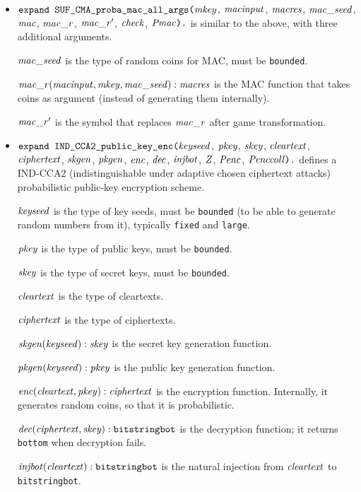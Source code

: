 \documentclass{article}
\begin{document}
\begin{itemize}
\item $\texttt{expand SUF\_CMA\_proba\_mac\_all\_args(}\mathit{mkey}$,
$  \mathit{macinput}$, $\mathit{macres}$, $\mathit{mac\_seed}$, $\mathit{mac}$, $\mathit{mac\_r}$, $\mathit{mac\_r}'$, $\mathit{check}$, 
  $\mathit{Pmac}\texttt{).}$ is similar to the above,
  with three additional arguments. 

  $\mathit{mac\_seed}$ is the type of random coins for MAC, must be \texttt{bounded}.

  $\mathit{mac\_r}(\mathit{macinput}, \mathit{mkey}, \mathit{mac\_seed}): \mathit{macres}$ is the MAC function that takes coins as argument (instead of generating them internally).

  $\mathit{mac\_r}'$ is the symbol that replaces $\mathit{mac\_r}$ after game transformation.

\item $\texttt{expand IND\_CCA2\_public\_key\_enc(}\mathit{keyseed}$, $\mathit{pkey}$, $\mathit{skey}$,
$  \mathit{cleartext}$, $\mathit{ciphertext}$, $\mathit{skgen}$, $\mathit{pkgen}$, $\mathit{enc}$, $\mathit{dec}$, $\mathit{injbot}$, $\mathit{Z}$, $\mathit{Penc}$, $\mathit{Penccoll}\texttt{).}$ defines a
  IND-CCA2 (indistinguishable under adaptive chosen ciphertext attacks)
  probabilistic public-key encryption scheme.

   $\mathit{keyseed}$ is the type of key seeds, must be \texttt{bounded} (to be able to generate random numbers from it), typically \texttt{fixed} and \texttt{large}.

   $\mathit{pkey}$ is the type of public keys, must be \texttt{bounded}.

   $\mathit{skey}$ is the type of secret keys, must be \texttt{bounded}.

   $\mathit{cleartext}$ is the type of cleartexts.

   $\mathit{ciphertext}$ is the type of ciphertexts.

   $\mathit{skgen}(\mathit{keyseed}): \mathit{skey}$ is the secret key generation function.

   $\mathit{pkgen}(\mathit{keyseed}): \mathit{pkey}$ is the public key generation function.

   $\mathit{enc}(\mathit{cleartext}, \mathit{pkey}): \mathit{ciphertext}$ is the encryption function. Internally, it generates random coins, so that it is probabilistic.

   $\mathit{dec}(\mathit{ciphertext}, \mathit{skey}): \texttt{bitstringbot}$ is the
  decryption function; it returns \texttt{bottom} when decryption
  fails.

   $\mathit{injbot}(\mathit{cleartext}): \texttt{bitstringbot}$ is the natural
  injection from $\mathit{cleartext}$ to \texttt{bitstringbot}.


\end{itemize}
\end{document}
